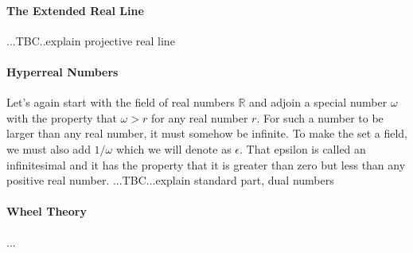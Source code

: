 \paragraph{The Extended Real Line}...TBC..explain projective real line 




\paragraph{Hyperreal Numbers} Let's again start with the field of real numbers $\mathbb{R}$ and adjoin a special number $\omega$ with the property that $\omega > r$ for any real number $r$. For such a number to be larger than any real number, it must somehow be infinite. To make the set a field, we must also add $1/\omega$ which we will denote as $\epsilon$. That epsilon is called an infinitesimal and it has the property that it is greater than zero but less than any positive real number.  ...TBC...explain standard part, dual numbers

\paragraph{Wheel Theory}...





